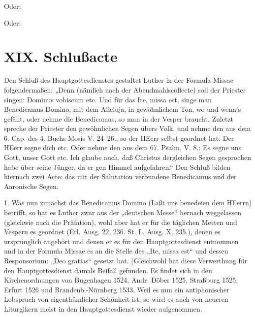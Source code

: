 

Oder:


Oder:




\chapter{XIX. Schlußacte}


Den Schluß des Hauptgottesdienstes gestaltet Luther in der Formula Missae folgendermaßen: „Denn (nämlich nach der Abendmahlscollecte) soll der Priester singen: Dominus vobiscum etc. Und für das Ite, missa est, singe man Benedicamus Domino, mit dem Alleluja, in gewöhnlichem Ton, wo und wenn’s gefällt, oder nehme die Benedicamus, so man in der Vesper braucht. Zuletzt spreche der Priester den gewöhnlichen Segen übers Volk, und nehme den aus dem 6. Cap. des 4. Buchs Mosis V. 24–26., so der HEerr selbst geordnet hat: Der HEerr segne dich etc. Oder nehme den aus dem 67. Psalm, V. 8.: Es segne uns Gott, unser Gott etc. Ich glaube auch, daß Christus dergleichen Segen gesprochen habe über seine Jünger, da er gen Himmel aufgefahren.“ Den Schluß bilden hiernach zwei Acte: das mit der Salutation verbundene Benedicamus und der Aaronische Segen.

1. Was nun zunächst das Benedicamus Domino (Laßt uns benedeien dem HEerrn) betrifft, so hat es Luther zwar aus der „deutschen Messe“ hernach weggelassen (gleichwie auch die Präfation), wohl aber hat er für die täglichen Metten und Vespern es geordnet (Erl. Ausg. 22, 236. St. L. Ausg. X, 235.), denen es ursprünglich angehört und denen er es für den Hauptgottesdienst entnommen und in der Formula Missae es an die Stelle des „Ite, missa est“ und dessen Responsorium: „Deo gratias“ gesetzt hat. (Gleichwohl hat diese Verwerthung für den Hauptgottesdienst damals Beifall gefunden. Es findet sich in den Kirchenordnungen von Bugenhagen 1524, Andr. Döber 1525, Straßburg 1525, Erfurt 1526 und Brandenb.-Nürnberg 1533. Weil es nun ein antiphonischer Lobspruch von eigenthümlicher Schönheit ist, so wird es auch von neueren Liturgikern meist in den Hauptgottesdienst wieder aufgenommen.

